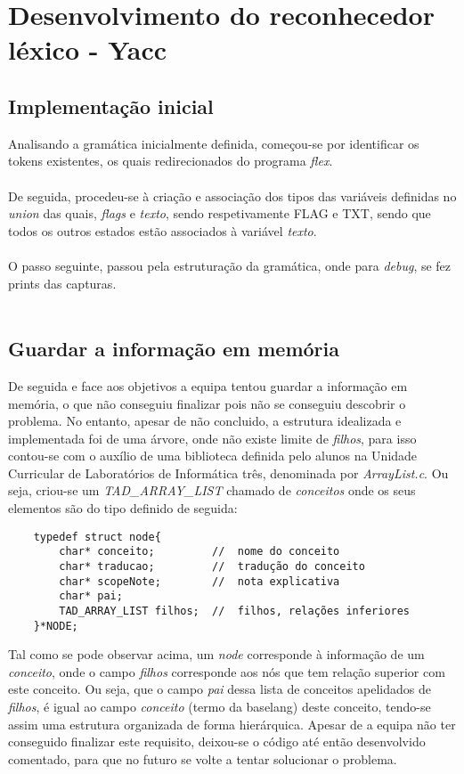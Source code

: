 \documentclass[11pt,a4paper]{report}%
\begin{document}
\section{Desenvolvimento do reconhecedor léxico - Yacc}

\subsection{Implementação inicial}
Analisando a gramática inicialmente definida, começou-se por identificar os tokens existentes, os quais redirecionados do programa \emph{flex}.\\\\De seguida, procedeu-se à criação e associação dos tipos das variáveis definidas no \emph{union} das quais, \emph{flags} e \emph{texto}, sendo respetivamente FLAG e TXT, sendo que todos os outros estados estão associados à variável \emph{texto}.\\\\
O passo seguinte, passou pela estruturação da gramática, onde para \emph{debug}, se fez prints das capturas.\\\\

\subsection{Guardar a informação em memória}
De seguida e face aos objetivos a equipa tentou guardar a informação em memória, o que não conseguiu finalizar pois não se conseguiu descobrir o problema. No entanto, apesar de não concluido, a estrutura idealizada e implementada foi de uma árvore, onde não existe limite de \emph{filhos}, para isso contou-se com o auxílio de uma biblioteca definida pelo alunos na Unidade Curricular de Laboratórios de Informática três, denominada por \emph{ArrayList.c}. Ou seja, criou-se um \emph{TAD\_ARRAY\_LIST} chamado de \emph{conceitos} onde os seus elementos são do tipo definido de seguida:

\begin{verbatim}
    typedef struct node{
        char* conceito;			//	nome do conceito
        char* traducao;			//	tradução do conceito
        char* scopeNote;		//	nota explicativa
        char* pai;
        TAD_ARRAY_LIST filhos;	//	filhos, relações inferiores
    }*NODE;
\end{verbatim}

Tal como se pode observar acima, um \emph{node} corresponde à informação de um \emph{conceito}, onde o campo \emph{filhos} corresponde aos nós que tem relação superior com este conceito. Ou seja, que o campo \emph{pai} dessa lista de conceitos apelidados de \emph{filhos},  é igual ao campo \emph{conceito} (termo da baselang) deste conceito, tendo-se assim uma estrutura organizada de forma hierárquica. Apesar de a equipa não ter conseguido finalizar este requisito, deixou-se o código até então desenvolvido comentado, para que no futuro se volte a tentar solucionar o problema.
\end{document}
